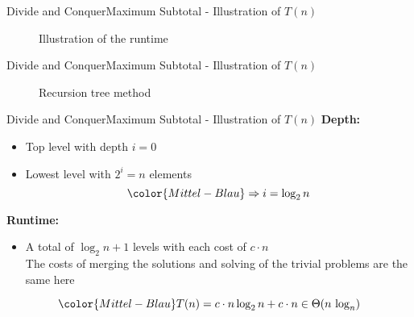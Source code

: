 
\begin{frame}{Divide and Conquer}{Maximum Subtotal - Illustration of $T(n)$}
  \begin{figure}
    \begin{adjustbox}{width=\linewidth}
      
    \end{adjustbox}
    \caption{Illustration of the runtime}
    \label{fig:divide_and_conquer:max_sub_array_runtime}
  \end{figure}
\end{frame}


\begin{frame}{Divide and Conquer}{Maximum Subtotal - Illustration of $T(n)$}
  \begin{figure}
    \begin{adjustbox}{width=\linewidth}
      
    \end{adjustbox}
    \caption{Recursion tree method}
    \label{fig:divide_and_conquer:max_sub_array_runtime_tree}
  \end{figure}
\end{frame}


\begin{frame}{Divide and Conquer}{Maximum Subtotal - Illustration of $T(n)$}
  \textbf{Depth:}
  \begin{itemize}
    \item
      Top level with depth {\color{Mittel-Blau}$i = 0$}
    \item
      Lowest level with {\color{Mittel-Blau}$2^i = n$} elements
      \begin{displaymath}
        {\color{Mittel-Blau}\Rightarrow i = \log_2 n}
      \end{displaymath}
  \end{itemize}
  \textbf{Runtime:}
  \begin{itemize}
    \item
      A total of {\color{Mittel-Blau}$\log_2 n + 1$} levels with each cost of
      {\color{Mittel-Blau}$c \cdot n$}\\
      \color{gray}
      The costs of merging the solutions and solving of the trivial
      problems are the same here
  \end{itemize}
  \begin{displaymath}
    {\color{Mittel-Blau}
    T(n) = c \cdot n \log_2 n + c \cdot n \in \Theta(n\,\log_n)}
  \end{displaymath}
\end{frame}


